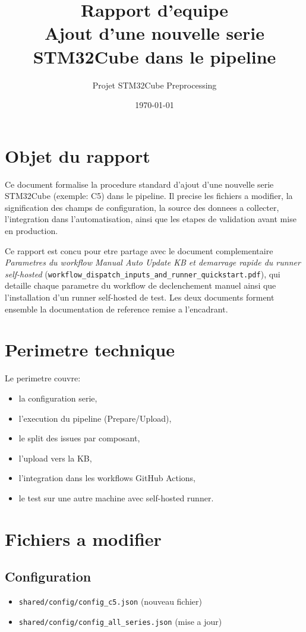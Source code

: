 \documentclass[11pt,a4paper]{article}
\title{Rapport d'equipe\\Ajout d'une nouvelle serie STM32Cube dans le pipeline}
\author{Projet STM32Cube Preprocessing}
\date{\today}
\begin{document}
\maketitle
\tableofcontents
\newpage

\section{Objet du rapport}
Ce document formalise la procedure standard d'ajout d'une nouvelle serie STM32Cube
(exemple: C5) dans le pipeline. Il precise les fichiers a modifier, la signification
des champs de configuration, la source des donnees a collecter, l'integration dans
l'automatisation, ainsi que les etapes de validation avant mise en production.

Ce rapport est concu pour etre partage avec le document complementaire
\emph{Parametres du workflow Manual Auto Update KB et demarrage rapide du runner
self-hosted} (\texttt{workflow\_dispatch\_inputs\_and\_runner\_quickstart.pdf}), qui
detaille chaque parametre du workflow de declenchement manuel ainsi que
l'installation d'un runner self-hosted de test. Les deux documents forment ensemble
la documentation de reference remise a l'encadrant.

\section{Perimetre technique}
Le perimetre couvre:
\begin{itemize}[leftmargin=*]
  \item la configuration serie,
  \item l'execution du pipeline (Prepare/Upload),
  \item le split des issues par composant,
  \item l'upload vers la KB,
  \item l'integration dans les workflows GitHub Actions,
  \item le test sur une autre machine avec self-hosted runner.
\end{itemize}

\section{Fichiers a modifier}
\subsection{Configuration}
\begin{itemize}[leftmargin=*]
  \item \texttt{shared/config/config\_c5.json} (nouveau fichier)
  \item \texttt{shared/config/config\_all\_series.json} (mise a jour)
\end{itemize}
\end{document}
